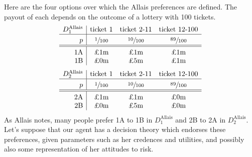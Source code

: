\documentclass[a4paper]{article}
\newcommand\Tstrut{\rule{0pt}{2.6ex}}       %
\newcommand\Bstrut{\rule[-0.9ex]{0pt}{0pt}} %
\renewcommand{\color}[1]{}
\newenvironment{CCM rewritten}
{\begingroup\color{blue}} %
{\endgroup}              %
\begin{document}
%
Here are the four options over which the Allais preferences are defined. The payout of each depends on the outcome of a lottery with 100 tickets. 
%	
$$
\begin{array}{r|ccc}
	D^{\mathrm{Allais}}_1 & \text{ticket 1} &\text{ticket 2-11}& \text{ticket 12-100}\Bstrut \\\hline \Tstrut	p & \sfrac{1}{100} & \sfrac{10}{100} & \sfrac{89}{100} \Bstrut \\\hline \hline\Tstrut 
	\text{1A} & \text{\pounds 1m} & \text{\pounds 1m}  & \text{\pounds 1m} \\
	\text{1B} & \text{\pounds 0m} & \text{\pounds 5m}  & \text{\pounds 1m}
\end{array}
$$$$
\begin{array}{r|ccc}
	D^{\mathrm{Allais}}_2 & \text{ticket 1} &\text{ticket 2-11}& \text{ticket 12-100}\Bstrut \\\hline \Tstrut	p & \sfrac{1}{100} & \sfrac{10}{100} & \sfrac{89}{100} \Bstrut \\\hline \hline\Tstrut 
	\text{2A} & \text{\pounds 1m} & \text{\pounds 1m}  & \text{\pounds 0m} \\
	\text{2B} & \text{\pounds 0m} & \text{\pounds 5m}  & \text{\pounds 0m} 
\end{array}
$$
As Allais notes, many people prefer 1A to 1B in $D^{\mathrm{Allais}}_1$ and 2B to 2A in $D^{\mathrm{Allais}}_2$.
Let's suppose that our agent has a decision theory which endorses these preferences, given parameters such as her credences and utilities, and possibly also some representation of her attitudes to risk.

\end{document}
